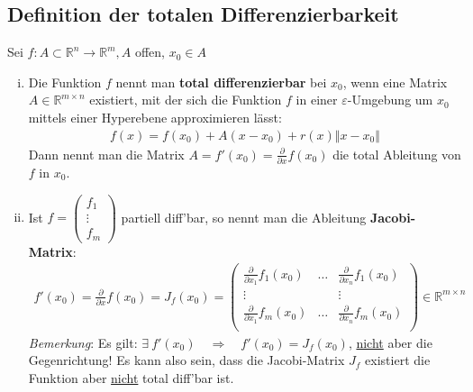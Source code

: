 \documentclass[11pt,a4paper]{book}
\newcommand {\Rn}	{\mathbb{R}^n}
\newcommand {\Rm}	{\mathbb{R}^m}
\newcommand {\Rmxn}	{\mathbb{R}^{m \times n}}
\newcommand{\1}    	{\mathbbm{1}}
\begin{document}
\subsection{Definition der totalen Differenzierbarkeit}
Sei \(f : A \subset \Rn \rightarrow \Rm, A\) offen, \(x_0 \in A\)
\begin{enumerate}[(i)]
	\item Die Funktion \(f\) nennt man \textbf{total differenzierbar} bei \(x_0\), wenn eine Matrix \(A \in \Rmxn\) existiert, mit der sich die Funktion \(f\) in einer \(\varepsilon\)-Umgebung um \(x_0\) mittels einer Hyperebene approximieren lässt:
	\begin{align*}
		f(x) = f(x_0) + A(x-x_0) + r(x)\Vert x - x_0 \Vert
	\end{align*}
	Dann nennt man die Matrix \(A = f'(x_0) = \frac{\partial}{\partial x} f(x_0)\) die total Ableitung von \(f\) in \(x_0\).
	\item Ist \(f = \left( \begin{array}{c} f_1 \\ \vdots \\ f_m \end{array} \right) \) partiell diff'bar, so nennt man die Ableitung \textbf{Jacobi-Matrix}:
	\begin{align*}
		f'(x_0) = \frac{\partial}{\partial x} f(x_0) = J_f(x_0) = \left( \begin{array}{ccc}
			\frac{\partial}{\partial x_1} f_1(x_0) & \hdots & \frac{\partial}{\partial x_n} f_1(x_0) \\
			\vdots & & \vdots \\
			\frac{\partial}{\partial x_1} f_m(x_0) & \hdots & \frac{\partial}{\partial x_n} f_m(x_0) \\
		\end{array} \right) \in \Rmxn
	\end{align*}
	\textit{Bemerkung}: Es gilt: \( \exists~ f'(x_0) \quad \Rightarrow \quad f'(x_0) = J_f(x_0) \), \underline{nicht} aber die Gegenrichtung! Es kann also sein, dass die Jacobi-Matrix \(J_f\) existiert die Funktion aber \underline{nicht} total diff'bar ist.
\end{enumerate}
\end{document}
